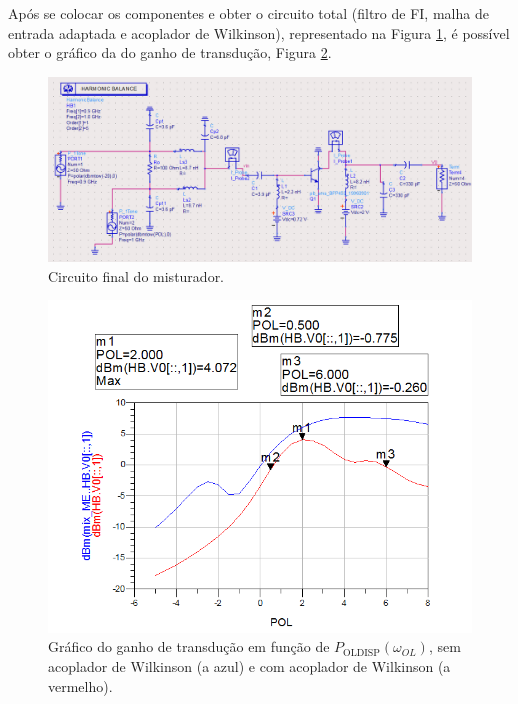 \documentclass[11pt]{article}
\numberwithin{equation}{section}
\begin{document}
Após se colocar os componentes e obter o circuito total (filtro de FI, malha de entrada adaptada e acoplador de Wilkinson), representado na Figura \ref{fig:Circuito_3}, é possível obter o gráfico da do ganho de transdução, Figura \ref{fig:GT_3}.

\pagebreak

\begin{figure}[h]
\centering
\includegraphics[keepaspectratio=true, scale=0.45]{exps/Circuito_3}
\vspace{-0.5em}
\caption{Circuito final do misturador.}
\vspace{-0.8em}
\label{fig:Circuito_3}
\end{figure}

\begin{figure}[h]
\centering
\includegraphics[keepaspectratio=true, scale=0.45]{exps/GT_3}
\vspace{-0.5em}
\caption{Gráfico do ganho de transdução em função de $ P_{\text{OLDISP}}\left(\omega_{OL}\right) $, sem acoplador de Wilkinson (a azul) e com acoplador de Wilkinson (a vermelho).}
\vspace{-0.8em}
\label{fig:GT_3}
\end{figure}
\end{document}
